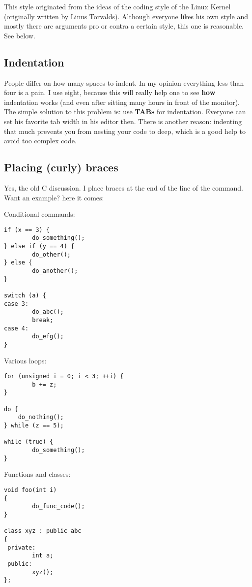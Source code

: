 \documentclass{report}
\begin{document}
This style originated from the ideas of the coding style of the Linux
Kernel (originally written by Linus Torvalds). Although everyone likes
his own style and mostly there are arguments pro or contra a certain
style, this one is reasonable. See below.
    

\subsection{Indentation}
People differ on how many spaces to indent. In my opinion everything
less than four is a pain. I use eight, because this will really help one
to see \textbf{how} indentation works (and even after sitting many hours
in front of the monitor). The simple solution to this problem is: use
\textbf{TABs} for indentation. Everyone can set his favorite tab width
in his editor then. There is another reason: indenting that much
prevents you from nesting your code to deep, which is a good help to
avoid too complex code.
    

\subsection{Placing (curly) braces}

Yes, the old C discussion. I place braces at the end of the line of the
command. Want an example? here it comes:
    
Conditional commands:
    
\begin{verbatim}
if (x == 3) {
        do_something();
} else if (y == 4) {
        do_other();
} else {
        do_another();
}

switch (a) {
case 3:
        do_abc();
        break;
case 4:
        do_efg();
}
\end{verbatim}

    Various loops:
    
    \begin{verbatim}
for (unsigned i = 0; i < 3; ++i) {
        b += z;
}

do {
    do_nothing();
} while (z == 5);

while (true) {
        do_something();
}
\end{verbatim}

    Functions and classes:
    
    \begin{verbatim}
void foo(int i)
{
        do_func_code();
}

class xyz : public abc
{
 private:
        int a;
 public:
        xyz();
};
\end{verbatim}
\end{document}
